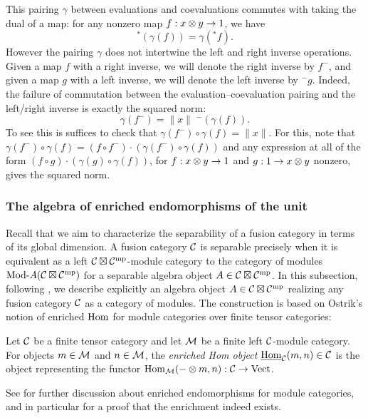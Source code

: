 \documentclass{amsart}
\begin{document}
This pairing $\gamma$ between evaluations and coevaluations commutes with taking the dual of a map: for any nonzero map $f: x \otimes y \rightarrow 1$, we have
\[
{}^*(\gamma(f)) = \gamma({}^* f).
\]
However the pairing $\gamma$ does not intertwine the left and right inverse operations.  Given a map $f$ with a right inverse, we will denote the right inverse by $f^{-}$, and given a map $g$ with a left inverse, we will denote the left inverse by ${}^- \!g$.  Indeed, the failure of commutation between the evaluation--coevaluation pairing and the left/right inverse is exactly the squared norm:
\[
\gamma(f^{-}) = \lVert x \rVert \;{}^-\!(\gamma(f)).
\]
To see this is suffices to check that $\gamma(f^{-}) \circ \gamma(f) = \lVert x \rVert$.  For this, note that $\gamma(f^{-}) \circ \gamma(f) = (f \circ f^{-}) \cdot (\gamma(f^{-}) \circ \gamma(f))$ and any expression at all of the form $(f \circ g) \cdot (\gamma(g) \circ \gamma(f))$, for $f: x \otimes y \rightarrow 1$ and $g: 1 \rightarrow x \otimes y$ nonzero, gives the squared norm.


\subsubsection{The algebra of enriched endomorphisms of the unit} \label{sec:enrichedendo}

Recall that we aim to characterize the separability of a fusion category in terms of its global dimension.  A fusion category $\mathcal C$ is separable precisely when it is equivalent as a left $\mathcal C \boxtimes \mathcal C^{\mathrm{mp}}$-module category to the category of modules $\Mod{}{A}(\cC \boxtimes \cC^\mp)$ for a separable algebra object $A \in \mathcal C \boxtimes \mathcal C^{\mathrm{mp}}$.  In this subsection, following \cite{MR2097289,MR1966524}, we describe explicitly an algebra object $A \in \mathcal C \boxtimes \mathcal C^{\mathrm{mp}}$ realizing any fusion category $\mathcal C$ as a category of modules.  The construction is based on Ostrik's notion of enriched $\operatorname{Hom}$ for module categories over finite tensor categories: 
\begin{definition}
Let $\mathcal C$ be a finite tensor category and let $\mathcal M$ be a finite left $\mathcal C$-module category.  For objects $m \in \mathcal M$ and $n \in \mathcal M$, the \emph{enriched Hom object} $\operatorname{\underline{Hom}}_\mathcal C(m,n) \in \mathcal C$ is the object representing the functor $\operatorname{Hom}_\mathcal M(- \otimes m,n): \mathcal C \rightarrow \mathrm{Vect}$.
\end{definition}
\nid See \cite{MR1976459, EO-ftc, EGNO, BTP} for further discussion about enriched endomorphisms for module categories, and in particular for a proof that the enrichment indeed exists.
\end{document}
